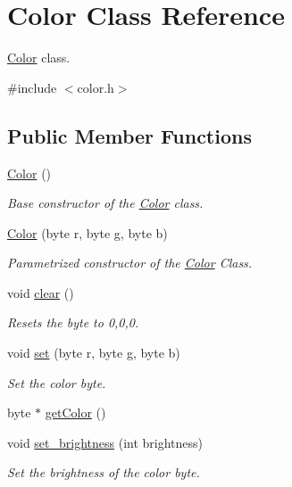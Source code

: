 \hypertarget{classColor}{}\section{Color Class Reference}
\label{classColor}


\hyperlink{classColor}{Color} class.  




{\ttfamily \#include $<$color.\+h$>$}

\subsection*{Public Member Functions}
\begin{DoxyCompactItemize}
\item 
\hyperlink{classColor_a9a742cbe9f9f4037f5d9f4e81a9b2428}{Color} ()
\begin{DoxyCompactList}\small\item\em Base constructor of the \hyperlink{classColor}{Color} class. \end{DoxyCompactList}\item 
\hyperlink{classColor_a570522f943999e39696b036797368a0d}{Color} (byte r, byte g, byte b)
\begin{DoxyCompactList}\small\item\em Parametrized constructor of the \hyperlink{classColor}{Color} Class. \end{DoxyCompactList}\item 
void \hyperlink{classColor_ab0c6950a93608622d4250bb91c59d149}{clear} ()\hypertarget{classColor_ab0c6950a93608622d4250bb91c59d149}{}\label{classColor_ab0c6950a93608622d4250bb91c59d149}

\begin{DoxyCompactList}\small\item\em Resets the byte to 0,0,0. \end{DoxyCompactList}\item 
void \hyperlink{classColor_ae1392c29fe5d28a9d242f203d7562a9a}{set} (byte r, byte g, byte b)
\begin{DoxyCompactList}\small\item\em Set the color byte. \end{DoxyCompactList}\item 
byte $\ast$ \hyperlink{classColor_adb6d171b8cb5f05040b8ac4e61622124}{get\+Color} ()
\item 
void \hyperlink{classColor_adb69d4d77a679f76d0935208576bd27f}{set\+\_\+brightness} (int brightness)
\begin{DoxyCompactList}\small\item\em Set the brightness of the color byte. \end{DoxyCompactList}\end{DoxyCompactItemize}
